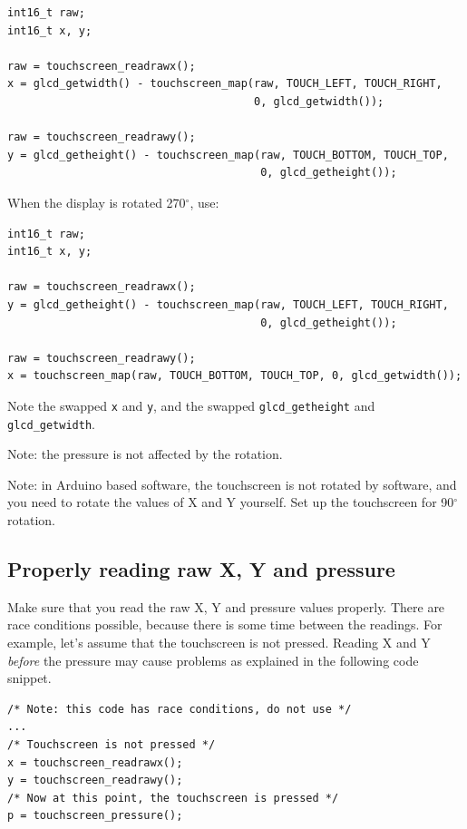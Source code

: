 \documentclass[12pt]{article}
\begin{document}
\begin{lstlisting}
int16_t raw;
int16_t x, y;

raw = touchscreen_readrawx();
x = glcd_getwidth() - touchscreen_map(raw, TOUCH_LEFT, TOUCH_RIGHT,
                                      0, glcd_getwidth());

raw = touchscreen_readrawy();
y = glcd_getheight() - touchscreen_map(raw, TOUCH_BOTTOM, TOUCH_TOP,
                                       0, glcd_getheight());
\end{lstlisting}

When the display is rotated 270$^\circ$, use:

\begin{lstlisting}
int16_t raw;
int16_t x, y;

raw = touchscreen_readrawx();
y = glcd_getheight() - touchscreen_map(raw, TOUCH_LEFT, TOUCH_RIGHT,
                                       0, glcd_getheight());

raw = touchscreen_readrawy();
x = touchscreen_map(raw, TOUCH_BOTTOM, TOUCH_TOP, 0, glcd_getwidth());
\end{lstlisting}

Note the swapped \lstinline|x| and \lstinline|y|, and the swapped \lstinline|glcd_getheight| and \lstinline|glcd_getwidth|.

Note: the pressure is not affected by the rotation.

Note: in Arduino based software, the touchscreen is not rotated by software, and you need to rotate the values of X and Y yourself. Set up the touchscreen for 90$^\circ$ rotation.

\subsection{Properly reading raw X, Y and pressure}
Make sure that you read the raw X, Y and pressure values properly. There are race conditions possible, because there is some time between the readings. For example, let's assume that the touchscreen is not pressed. Reading X and Y \textsl{before} the pressure may cause problems as explained in the following code snippet.

\begin{lstlisting}
/* Note: this code has race conditions, do not use */
...
/* Touchscreen is not pressed */
x = touchscreen_readrawx();
y = touchscreen_readrawy();
/* Now at this point, the touchscreen is pressed */
p = touchscreen_pressure();
\end{lstlisting}
\end{document}

